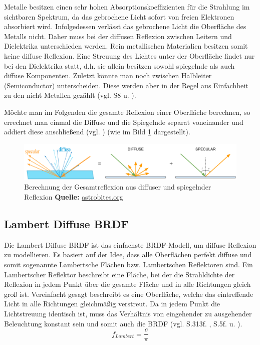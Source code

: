 \documentclass[
  11pt,
  a4paper,
  oneside
  ]{article}
\begin{document}
Metalle besitzen einen sehr hohen Absorptionskoeffizienten für die Strahlung im sichtbaren Spektrum, da das gebrochene Licht sofort von freien Elektronen absorbiert wird. Infolgedessen verlässt das gebrochene Licht die Oberfläche des Metalls nicht. Daher muss bei der diffusen Reflexion zwischen Leitern und Dielektrika unterschieden werden. Rein metallischen Materialien besitzen somit keine diffuse Reflexion. Eine Streuung des Lichtes unter der Oberfläche findet nur bei den Dielektrika statt, d.h. sie allein besitzen sowohl spiegelnde als auch diffuse Komponenten. Zuletzt könnte man noch zwischen Halbleiter (Semiconductor) unterscheiden. Diese werden aber in der Regel aus Einfachheit zu den nicht Metallen gezählt 
(vgl. S8 \cite{rtrPaper} u. \cite{pbrGuide,learnOpenGL,googleFilamentPbr}).

Möchte man im Folgenden die gesamte Reflexion einer Oberfläche berechnen, so errechnet man einmal die Diffuse und die Spiegelnde separat voneinander und addiert diese anschließend (vgl. \cite{learnOpenGL}) (wie im Bild \ref{fig:img1} dargestellt).
\begin{figure}[H]
  \centering
  \includegraphics*[width=1 \textwidth]{images/brdf.PNG}
  \caption{Berechnung der Gesamtreflexion aus diffuser und spiegelnder Reflexion \footnotesize\textbf{Quelle:} \url{astrobites.org} \cite{astrobites}}
  \label{fig:img1}
\end{figure}

\subsection{Lambert Diffuse BRDF}
Die Lambert Diffuse BRDF ist das einfachste BRDF-Modell, um diffuse Reflexion zu modellieren. Es basiert auf der Idee, dass alle Oberflächen perfekt diffuse und somit sogenannte Lambertsche Flächen bzw. Lambertschen Reflektoren sind. Ein Lambertscher Reflektor beschreibt eine Fläche, bei der die Strahldichte der Reflexion in jedem Punkt über die gesamte Fläche und in alle Richtungen gleich groß ist. Vereinfacht gesagt beschreibt es eine Oberfläche, welche das eintreffende Licht in alle Richtungen gleichmäßig verstreut. Da in jedem Punkt die Lichtstreuung identisch ist, muss das Verhältnis von eingehender zu ausgehender Beleuchtung konstant sein und somit auch die BRDF 
(vgl. S.313f. \cite{realTimeRendering4th}, S.5f. \cite{irrlichtOrg} u. \cite{learnOpenGL}). 
\begin{equation}
  f_{Lambert}=\dfrac{c}{\pi}
\end{equation}
\end{document}
